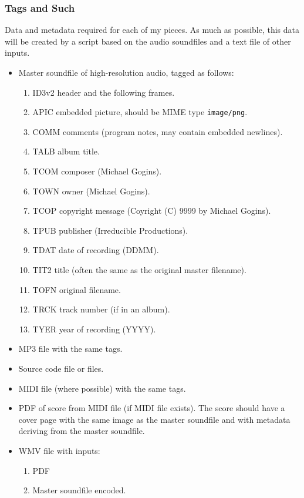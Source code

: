 \documentclass[english,11pt,letterpaper,onecolumn]{scrartcl}
\begin{document}
\subsubsection*{Tags and Such}

Data and metadata required for each of my pieces. As much as possible, this data will be created by a script based on the audio soundfiles and a text file of other inputs.

\begin{itemize}
	\item Master soundfile of high-resolution audio, tagged as follows:
	\begin{enumerate}
		\item ID3v2 header and the following frames.
		\item APIC embedded picture, should be MIME type \texttt{image/png}.
		\item COMM comments (program notes, may contain embedded newlines).
		\item TALB album title.
		\item TCOM composer (Michael Gogins).
		\item TOWN owner (Michael Gogins).
		\item TCOP copyright message (Coyright (C) 9999 by Michael Gogins).
		\item TPUB publisher (Irreducible Productions).
		\item TDAT date of recording (DDMM).
		\item TIT2 title (often the same as the original master filename).
		\item TOFN original filename.
		\item TRCK track number (if in an album).
		\item TYER year of recording (YYYY).
	\end{enumerate}
	\item MP3 file with the same tags.
	\item Source code file or files.
	\item MIDI file (where possible) with the same tags.
	\item PDF of score from MIDI file (if MIDI file exists). The score should have a cover page with the same image as the master soundfile and with metadata deriving from the master soundfile.
	\item WMV file with inputs:
	\begin{enumerate}
		\item PDF
		\item Master soundfile encoded.

	\end{enumerate}
\end{itemize}
\end{document}
